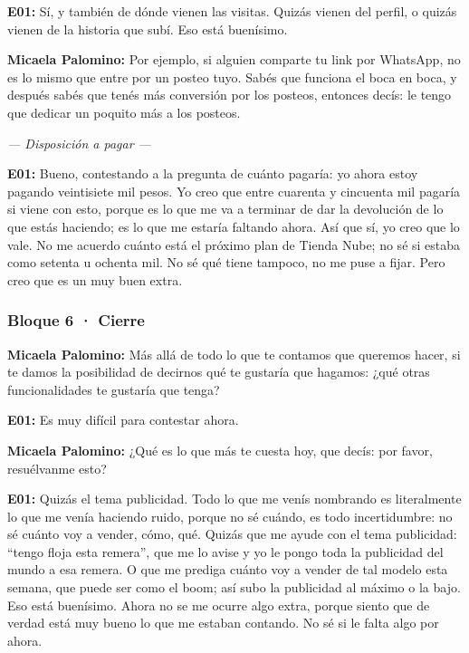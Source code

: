 \noindent\textbf{E01:} Sí, y también de dónde vienen las visitas. Quizás vienen del perfil, o quizás vienen de la historia que subí. Eso está buenísimo.

\noindent\textbf{Micaela Palomino:} Por ejemplo, si alguien comparte tu link por WhatsApp, no es lo mismo que entre por un posteo tuyo. Sabés que funciona el boca en boca, y después sabés que tenés más conversión por los posteos, entonces decís: le tengo que dedicar un poquito más a los posteos.

\noindent\textit{--- Disposición a pagar ---}

\noindent\textbf{E01:} Bueno, contestando a la pregunta de cuánto pagaría: yo ahora estoy pagando veintisiete mil pesos. Yo creo que entre cuarenta y cincuenta mil pagaría si viene con esto, porque es lo que me va a terminar de dar la devolución de lo que estás haciendo; es lo que me estaría faltando ahora. Así que sí, yo creo que lo vale. No me acuerdo cuánto está el próximo plan de Tienda Nube; no sé si estaba como setenta u ochenta mil. No sé qué tiene tampoco, no me puse a fijar. Pero creo que es un muy buen extra.

\subsubsection*{Bloque 6 · Cierre}

\noindent\textbf{Micaela Palomino:} Más allá de todo lo que te contamos que queremos hacer, si te damos la posibilidad de decirnos qué te gustaría que hagamos: ¿qué otras funcionalidades te gustaría que tenga?

\noindent\textbf{E01:} Es muy difícil para contestar ahora.

\noindent\textbf{Micaela Palomino:} ¿Qué es lo que más te cuesta hoy, que decís: por favor, resuélvanme esto?

\noindent\textbf{E01:} Quizás el tema publicidad. Todo lo que me venís nombrando es literalmente lo que me venía haciendo ruido, porque no sé cuándo, es todo incertidumbre: no sé cuánto voy a vender, cómo, qué. Quizás que me ayude con el tema publicidad: ``tengo floja esta remera'', que me lo avise y yo le pongo toda la publicidad del mundo a esa remera. O que me prediga cuánto voy a vender de tal modelo esta semana, que puede ser como el boom; así subo la publicidad al máximo o la bajo. Eso está buenísimo. Ahora no se me ocurre algo extra, porque siento que de verdad está muy bueno lo que me estaban contando. No sé si le falta algo por ahora.

